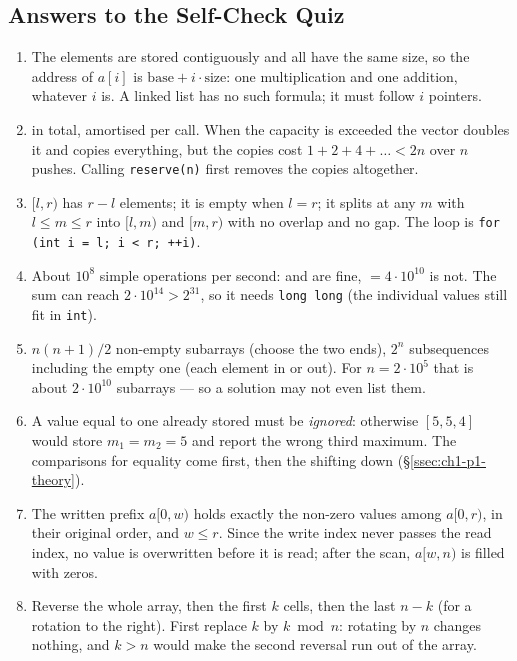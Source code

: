 \subsection*{Answers to the Self-Check Quiz}
\label{ssec:ch1-quiz-answers}

\begin{solutionbox}
\begin{enumerate}[leftmargin=*]
    \item The elements are stored contiguously and all have the same size, so the address of $a[i]$ is $\text{base} + i \cdot \text{size}$: one multiplication and one addition, whatever $i$ is. A linked list has no such formula; it must follow $i$ pointers.
    \item {} in total,  amortised per call. When the capacity is exceeded the vector doubles it and copies everything, but the copies cost $1 + 2 + 4 + \dots < 2n$ over $n$ pushes. Calling \texttt{reserve(n)} first removes the copies altogether.
    \item $[l, r)$ has $r - l$ elements; it is empty when $l = r$; it splits at any $m$ with $l \le m \le r$ into $[l, m)$ and $[m, r)$ with no overlap and no gap. The loop is \texttt{for (int i = l; i < r; ++i)}.
    \item About $10^8$ simple operations per second:  and  are fine,  $= 4 \cdot 10^{10}$ is not. The sum can reach $2 \cdot 10^{14} > 2^{31}$, so it needs \texttt{long long} (the individual values still fit in \texttt{int}).
    \item $n(n+1)/2$ non-empty subarrays (choose the two ends), $2^n$ subsequences including the empty one (each element in or out). For $n = 2 \cdot 10^5$ that is about $2 \cdot 10^{10}$ subarrays --- so a solution may not even list them.
    \item A value equal to one already stored must be \emph{ignored}: otherwise $[5, 5, 4]$ would store $m_1 = m_2 = 5$ and report the wrong third maximum. The comparisons for equality come first, then the shifting down (\S\ref{ssec:ch1-p1-theory}).
    \item The written prefix $a[0, w)$ holds exactly the non-zero values among $a[0, r)$, in their original order, and $w \le r$. Since the write index never passes the read index, no value is overwritten before it is read; after the scan, $a[w, n)$ is filled with zeros.
    \item Reverse the whole array, then the first $k$ cells, then the last $n - k$ (for a rotation to the right). First replace $k$ by $k \bmod n$: rotating by $n$ changes nothing, and $k > n$ would make the second reversal run out of the array.

\end{enumerate}
\end{solutionbox}
